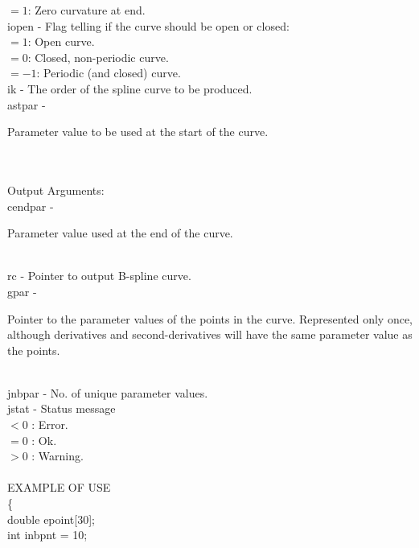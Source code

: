                   \>\>\>\> $=1$\>: Zero curvature at end.\\
        \>\>    {\fov iopen}\> - \>
                Flag telling if the curve should be open or closed:\\
                  \>\>\>\> $=1$\>: Open curve.\\
                  \>\>\>\> $=0$\>: Closed, non-periodic curve.\\
                  \>\>\>\> $=-1$\>: Periodic (and closed) curve.\\
        \>\>    {\fov ik}\> - \> The order of the spline curve to be produced.\\
        \>\>    {\fov astpar}\> - \>
        \begin{minipg2}
          Parameter value to be used at the start of the curve.
        \end{minipg2}\\
\\
        \>Output Arguments:\\
        \>\>    {\fov cendpar}\> - \>
        \begin{minipg2}
          Parameter value used at the end of the curve.
        \end{minipg2}\\
        \>\>    {\fov rc}\> - \> Pointer to output B-spline curve.\\
        \>\>    {\fov gpar}\> - \>
        \begin{minipg2}
          Pointer to the parameter values of the points in the
          curve. Represented only once, although derivatives and
          second-derivatives will have the same parameter value as the
          points.
        \end{minipg2}\\
        \>\>    {\fov jnbpar}\> - \> No. of unique parameter values.\\
        \>\>    {\fov jstat}\> - \> Status message\\
                \>\>\>\>\> $< 0$ : Error.\\
                \>\>\>\>\> $= 0$ : Ok.\\
                \>\>\>\>\> $> 0$ : Warning.\\
\\ %
EXAMPLE OF USE\\
        \>      \{ \\
        \>\>    double \>  {\fov epoint}[30];\\
        \>\>    int    \>  {\fov inbpnt} = 10;\\
